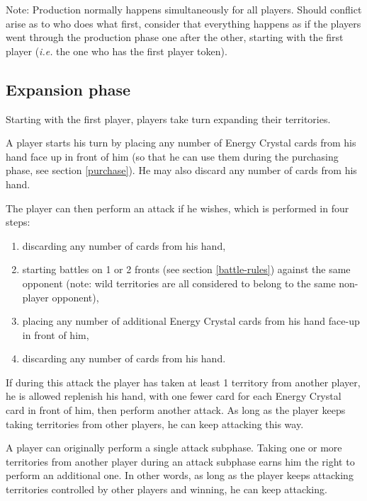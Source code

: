 \documentclass[a4paper]{article}
\begin{document}
        Note: Production normally happens simultaneously for all players.
        Should conflict arise as to who does what first,
        consider that everything happens as if the players went through
        the production phase one after the other, starting with the first player
        (\textit{i.e.} the one who has the first player token).

    \subsection{Expansion phase}
        \label{expansion}    
        Starting with the first player,
        players take turn expanding their territories.
        
        A player starts his turn by placing any number of Energy Crystal cards
        from his hand face up in front of him
        (so that he can use them during the purchasing phase,
        see section \ref{purchase}).
        He may also discard any number of cards from his hand.
        
        The player can then perform an attack if he wishes,
        which is performed in four steps:
        \vspace{-1.3em}
        \begin{enumerate}
            \item discarding any number of cards from his hand,
            \item starting battles on 1 or 2 fronts (see section \ref{battle-rules})
                against the same opponent (note: wild territories are all
                considered to belong to the same non-player opponent),
            \item placing any number of additional Energy Crystal
                cards from his hand face-up in front of him,
            \item discarding any number of cards from his hand.
        \end{enumerate}
        
        If during this attack the player has taken at least 1 territory
        from another player, he is allowed replenish his hand,
        with one fewer card for each Energy Crystal card in front of him,
        then perform another attack.
        As long as the player keeps taking territories from other players,
        he can keep attacking this way.
        
        A player can originally perform a single attack subphase.
        Taking one or more territories from another player during an attack subphase
        earns him the right to perform an additional one.
        In other words, as long as the player keeps attacking territories controlled by
        other players and winning, he can keep attacking.
        
\end{document}
